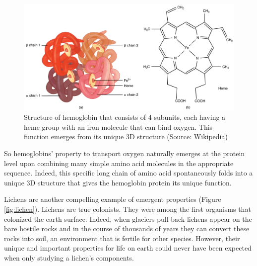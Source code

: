 \documentclass[
  11pt,
]{book}
\begin{document}
\begin{figure}

{\centering \includegraphics[width=1\linewidth]{./figs/hemoglobin} 

}

\caption{Structure of hemoglobin that consists of 4 subunits, each having a heme group with an iron molecule that can bind oxygen. This function emerges from its unique 3D structure (Source: Wikipedia)}\label{fig:hemoglobin}
\end{figure}

So hemoglobins' property to transport oxygen naturally emerges at the protein level upon combining many simple amino acid molecules in the appropriate sequence. Indeed, this specific long chain of amino acid spontaneously folds into a unique 3D structure that gives the hemoglobin protein its unique function.

\pagebreak

Lichens are another compelling example of emergent properties (Figure \ref{fig:lichen}). Lichens are true colonists. They were among the first organisms that colonized the earth surface.
Indeed, when glaciers pull back lichens appear on the bare hostile rocks and in the course of thousands of years they can convert these rocks into soil, an environment that is fertile for other species. However, their unique and important properties for life on earth could never have been expected when only studying a lichen's components.
\end{document}
